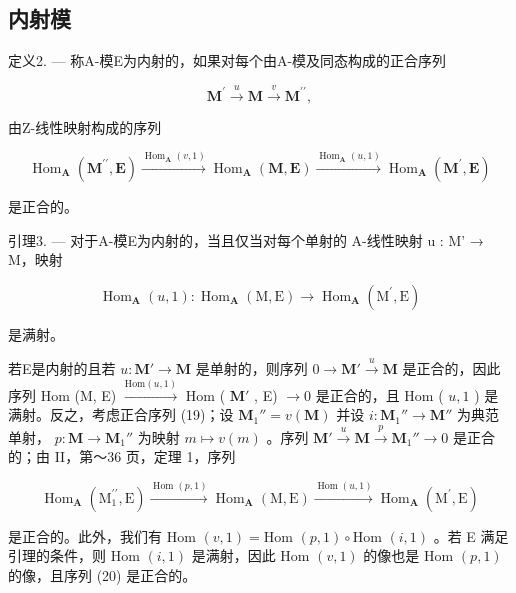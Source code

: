 \subsection{内射模}

定义2. --- 称A-模E为内射的，如果对每个由A-模及同态构成的正合序列

\[
\mathbf {M} ^ {\prime} \xrightarrow {u} \mathbf {M} \xrightarrow {v} \mathbf {M} ^ {\prime \prime},\tag{19}
\]

由Z-线性映射构成的序列

\[
\operatorname{Hom} _ {\mathbf {A}} \left(\mathbf {M} ^ {\prime \prime}, \mathbf {E}\right) \xrightarrow {\operatorname{Hom} _ {\mathbf {A}} (v , 1)} \operatorname{Hom} _ {\mathbf {A}} (\mathbf {M}, \mathbf {E}) \xrightarrow {\operatorname{Hom} _ {\mathbf {A}} (u , 1)} \operatorname{Hom} _ {\mathbf {A}} \left(\mathbf {M} ^ {\prime}, \mathbf {E}\right)\tag{20}
\]

是正合的。

引理3. --- 对于A-模E为内射的，当且仅当对每个单射的 A-线性映射 u : M' → M，映射

\[
\operatorname{Hom} _ {\mathbf {A}} (u, 1): \operatorname{Hom} _ {\mathbf {A}} (\mathrm{M}, \mathrm{E}) \rightarrow \operatorname{Hom} _ {\mathbf {A}} (\mathrm{M} ^ {\prime}, \mathrm{E})
\]

是满射。

若E是内射的且若 \(u: \mathbf{M}' \to \mathbf{M}\) 是单射的，则序列 \(0 \to \mathbf{M}' \xrightarrow{u} \mathbf{M}\) 是正合的，因此序列 Hom (M, E) \(\xrightarrow{\text{Hom}(u,1)}\) Hom ( \(\mathbf{M}'\) , E) \(\to 0\) 是正合的，且 Hom ( \(u,1\) ) 是满射。反之，考虑正合序列 (19)；设 \(\mathbf{M}_{1}'' = v(\mathbf{M})\) 并设 \(i: \mathbf{M}_{1}'' \to \mathbf{M}''\) 为典范单射， \(p: \mathbf{M} \to \mathbf{M}_{1}''\) 为映射 \(m \mapsto v(m)\) 。序列 \(\mathbf{M}' \xrightarrow{u} \mathbf{M} \xrightarrow{p} \mathbf{M}_{1}'' \to 0\) 是正合的；由 II，第～36 页，定理 1，序列

\[
\operatorname{Hom} _ {\mathbf {A}} \left(\mathrm{M} _ {1} ^ {\prime \prime}, \mathrm{E}\right) \xrightarrow {\operatorname{Hom} (p , 1)} \operatorname{Hom} _ {\mathbf {A}} (\mathrm{M}, \mathrm{E}) \xrightarrow {\operatorname{Hom} (u , 1)} \operatorname{Hom} _ {\mathbf {A}} \left(\mathrm{M} ^ {\prime}, \mathrm{E}\right)
\]

是正合的。此外，我们有 Hom \((v, 1) = \text{Hom } (p, 1) \circ \text{Hom } (i, 1)\) 。若 E 满足引理的条件，则 Hom \((i, 1)\) 是满射，因此 Hom \((v, 1)\) 的像也是 Hom \((p, 1)\) 的像，且序列 (20) 是正合的。

